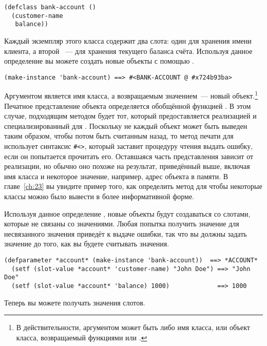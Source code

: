 \begin{lstlisting}
(defclass bank-account ()
  (customer-name
   balance))
\end{lstlisting}

Каждый экземпляр этого класса содержит два слота: один для хранения имени клиента, а
второй ~--- для хранения текущего баланса счёта.  Используя данное определение вы можете
создать новые объекты  с помощью .

\begin{lstlisting}[style=lisprepl]
  (make-instance 'bank-account) ==> #<BANK-ACCOUNT @ #x724b93ba>
\end{lstlisting}

Аргументом  является имя класса, а возвращаемым значением~--- новый
объект.\footnote{В действительности, аргументом  может быть либо имя
  класса, или объект класса, возвращаемый функциями  или
  .}  Печатное представление объекта определяется обобщённой функцией
.  В этом случае, подходящим методом будет тот, который предоставляется
реализацией и специализированный для .  Поскольку не каждый объект
может быть выведен таким образом, чтобы потом быть считанным назад, то метод печати для
 использует синтаксис \lstinline!#<>!, который заставит процедуру
чтения выдать ошибку, если он попытается прочитать его.  Оставшаяся часть представления
зависит от реализации, но обычно оно похоже на результат, приведённый выше, включая имя
класса и некоторое значение, например, адрес объекта в памяти.  В главе~\ref{ch:23} вы
увидите пример того, как определить метод для  чтобы некоторые классы
можно было вывести в более информативной форме.

Используя данное определение , новые объекты будут создаваться со
слотами, которые не связаны со значениями.  Любая попытка получить значение для
несвязанного значения приведёт к выдаче ошибки, так что вы должны задать значение до того,
как вы будете считывать значения.

\begin{lstlisting}[style=lisprepl]
  (defparameter *account* (make-instance 'bank-account))  ==> *ACCOUNT*
  (setf (slot-value *account* 'customer-name) "John Doe") ==> "John Doe"
  (setf (slot-value *account* 'balance) 1000)             ==> 1000
\end{lstlisting}

Теперь вы можете получать значения слотов.

